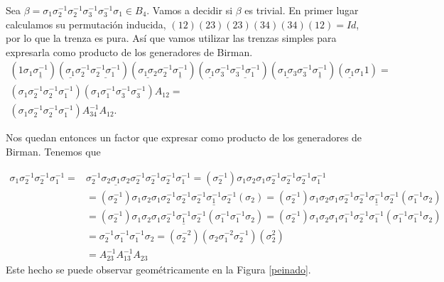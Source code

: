 \documentclass[TFG.tex]{subfiles}
\begin{document}
\begin{ej}
Sea $\beta=\sigma_1\sigma_2^{-1}\sigma_2^{-1}\sigma_3^{-1}\sigma_3^{-1}\sigma_1\in B_4$. Vamos a decidir si $\beta$ es trivial. En primer lugar calculamos su permutación inducida, $(12)(23)(23)(34)(34)(12)=Id$, por lo que la trenza es pura. Así que vamos utilizar las trenzas simples para expresarla como producto de los generadores de Birman. 
\begin{gather*}
(1\sigma_1\underline{\sigma_1^{-1}})(\underline{\sigma_1}\sigma_2^{-1}\underline{\sigma_2^{-1}\sigma_1^{-1}})(\underline{\sigma_1\sigma_2}\sigma_2^{-1}\underline{\sigma_1^{-1}})(\underline{\sigma_1}\sigma_3^{-1}\underline{\sigma_3^{-1}\sigma_1^{-1}})(\underline{\sigma_1\sigma_3}\sigma_3^{-1}\underline{\sigma_1^{-1}})(\underline{\sigma_1}\sigma_1 1)=\\
(\sigma_1\sigma_2^{-1}\sigma_2^{-1}\sigma_1^{-1})(\sigma_1\sigma_1^{-1}\sigma_3^{-1}\sigma_3^{-1})A_{12}=\\
(\sigma_1\sigma_2^{-1}\sigma_2^{-1}\sigma_1^{-1})A_{34}^{-1}A_{12}.
\end{gather*}

Nos quedan entonces un factor que expresar como producto de los generadores de Birman. Tenemos que
 
\begin{align*}
\sigma_1\sigma_2^{-1}\sigma_2^{-1}\sigma_1^{-1}=& \sigma_2^{-1}\underline{\sigma_2\sigma_1\sigma_2}\sigma_2^{-1}\sigma_2^{-1}\sigma_2^{-1}\sigma_1^{-1}=(\sigma_2^{-1})\sigma_1\sigma_2\sigma_1\sigma_2^{-1}\sigma_2^{-1}\sigma_2^{-1}\sigma_1^{-1}\\
&=(\sigma_2^{-1})\sigma_1\sigma_2\sigma_1\sigma_2^{-1}\sigma_2^{-1}\underline{\sigma_2^{-1}\sigma_1^{-1}\sigma_2^{-1}}(\sigma_2)=(\sigma_2^{-1})\sigma_1\sigma_2\sigma_1\sigma_2^{-1}\underline{\sigma_2^{-1}\sigma_1^{-1}\sigma_2^{-1}}(\sigma_1^{-1}\sigma_2)\\
&=(\sigma_2^{-1})\sigma_1\sigma_2\sigma_1\underline{\sigma_2^{-1}\sigma_1^{-1}\sigma_2^{-1}}(\sigma_1^{-1}\sigma_1^{-1}\sigma_2)=(\sigma_2^{-1})\sigma_1\sigma_2\sigma_1\sigma_1^{-1}\sigma_2^{-1}\sigma_1^{-1}(\sigma_1^{-1}\sigma_1^{-1}\sigma_2)\\
&=\sigma_2^{-1}\sigma_1^{-1}\sigma_1^{-1}\sigma_2= (\sigma_2^{-2})(\sigma_2\sigma_1^{-2}\sigma_2^{-1})(\sigma_2^2)\\
&=A_{23}^{-1}A_{13}^{-1}A_{23}
\end{align*}
Este hecho se puede observar geométricamente en la Figura \ref{peinado}.

\begin{figure}[h!]
\centering
{}
\end{figure}
\end{ej}
\end{document}

